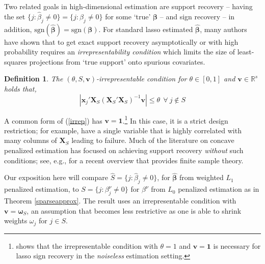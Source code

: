 \documentclass[12pt]{article}
\newtheorem{definition}{\sc Definition}[section]
\newcommand{\bs}[1]{\boldsymbol{#1}}
\newcommand{\mr}[1]{\mathrm{#1}}
\newcommand{\bm}[1]{\mathbf{#1}}
\newcommand{\ds}[1]{\mathds{#1}}
\begin{document}
Two related goals in high-dimensional estimation are  support recovery -- having the set $\{j: \hat\beta_j \neq 0\} = \{j: \beta_j \neq 0\}$ for some `true' $\bs{\beta}$ -- and  sign recovery -- in addition, $\mr{sgn}(\bs{\hat\beta}) = \mr{sgn}(\bs{\beta})$.  For standard lasso estimated $\bs{\hat\beta}$, many authors have shown \citep[e.g.,][]{buhlmann_statistics_2011,zou_adaptive_2006} that to get exact support recovery asymptotically or with high probability requires an {\it irrepresentability condition} which limits the size of least-squares projections from `true support' onto spurious covariates.  
\begin{definition} 
The $(\theta,S,\bm{v})$-irrepresentable condition for $\theta\in[0,1]$ and $\bm{v}\in \ds{R}^s$ holds that, 
\begin{equation}\label{irrep}
|\bs{x}_j'\bm{X}_S(\bm{X}_S'\bm{X}_S)^{-1}\bm{v}| \leq \theta ~~\forall~j\notin S
\end{equation}
\end{definition}

A common form of (\ref{irrep}) has $\bm{v}=\bm{1}$.\footnote{\cite{wainwright_sharp_2009} shows that the irrepresentable condition with $\theta=1$ and $\bm{v}=\bm{1}$ is necessary for lasso sign recovery in the {\it noiseless} estimation setting.} In this case, it
is a strict design restriction; for example,
\citet{buhlmann_statistics_2011} have a single variable that is
highly correlated with many columns of $\bm{X}_S$ leading to failure. Much
of the literature on concave penalized estimation has focused on achieving
support recovery {\it without} such conditions; see, e.g.,
\cite{fan_strong_2014} for a recent overview that provides finite sample
theory.  

Our exposition here will compare $\hat S = \{j: \hat\beta_j \neq 0\}$, for $\bs{\hat\beta}$ from weighted $L_1$ penalized estimation, to $S = \{j: \beta^\nu_j \neq 0\}$ for $\beta^\nu$ from $L_0$ penalized estimation as in Theorem \ref{sparseapprox}.  The result uses an irrepresentable condition with $\bm{v} = \bs{\omega}_S$, an assumption that becomes less restrictive as one is able to shrink weights $\omega_j$ for $j\in S$.
\end{document}
